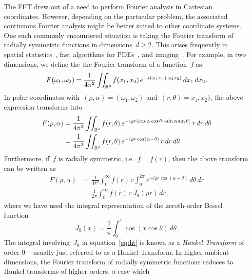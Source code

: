 The FFT drew out of a need to perform Fourier analysis in Cartesian coordinates.
However, depending on the particular problem, the associated continuous Fourier
analysis might be better suited to other coordinate systems. One such commonly
encountered situation is taking the Fourier transform of radially symmetric
functions in dimensions~$ d \geq 2$. This arises frequently in spatial
statistics~\cite{}, fast algorithms for PDEs~\cite{}, and imaging~\cite{}. For
example, in two dimensions, we define the the Fourier transform of a
function~$f$ as:
\begin{equation}
  F(\omega_1, \omega_2) = \frac{1}{4\pi^2} \iint_{\mathbb{R}^2} f(x_1, x_2) \, e^{-i(\omega_1 x_1 + \omega_2 x_2)}  \, dx_1 \, dx_2.
\end{equation}
In polar coordinates with~$(\rho,\alpha) = (\omega_1,\omega_2)$ and~$(r,\theta)
= x_1,x_2)$, the above expression transforms into
\begin{equation}
  \label{eq:ftpolar}
  \begin{aligned}
    F(\rho, \alpha) &= \frac{1}{4\pi^2} \iint_{\R^2} 
    f(r,\theta) \, 
    e^{-i \rho r (\cos\alpha \cos\theta + \sin\alpha \sin\theta) } 
    \, r \, dr \, d\theta \\
  &= \frac{1}{4\pi^2} \iint_{\R^2} f(r,\theta) \, e^{-i \rho r \cos(\alpha-\theta) } \, r \, dr \, d\theta.
  \end{aligned}
\end{equation}
Furthermore, if~$f$ is radially symmetric, i.e.~$f = f(r)$, then the above
transform can be written as
\begin{equation}
  \label{eq:ht}
  \begin{aligned}
  F(\rho,\alpha) &= \frac{1}{4\pi^2} \int_0^\infty f(r) \, r \int_0^{2\pi} 
  e^{-i \rho r \cos(\alpha - \theta) }  \, d\theta \, dr \\
  &= \frac{1}{2\pi} \int_0^\infty f(r) \, r \, J_0(\rho r)  \, dr,
  \end{aligned}
\end{equation}
where we have used the integral representation of the zeroth-order Bessel
function~\cite{}
\begin{equation}
  J_0(x) = \frac{1}{\pi} \int_0^\pi \cos \left( x \cos \theta \right) \, d\theta.
\end{equation}
The integral involving~$J_0$ in equation~\eqref{eq:ht} is known as a
\emph{Hankel Transform} of order 0 -- usually just referred to as a Hankel
Transform. In higher ambient dimensions, the Fourier transform of radially
symmetric functions reduces to Hankel transforms of higher orders, a case which
